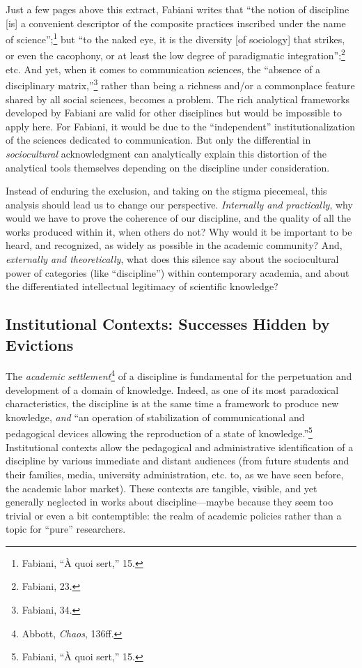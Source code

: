 \documentclass{tufte-handout}
\begin{document}
Just a few pages above this extract, Fabiani writes that ``the notion of
discipline {[}is{]} a convenient descriptor of the composite practices
inscribed under the name of science'';\footnote{Fabiani, ``À quoi
  sert,'' 15.} but ``to the naked eye, it is the diversity {[}of
sociology{]} that strikes, or even the cacophony, or at least the low
degree of paradigmatic integration'';\footnote{Fabiani, 23.} etc. And
yet, when it comes to communication sciences, the ``absence of a
disciplinary matrix,''\footnote{Fabiani, 34.} rather than being a
richness and/or a commonplace feature shared by all social sciences,
becomes a problem. The rich analytical frameworks developed by Fabiani
are valid for other disciplines but would be impossible to apply here.
For Fabiani, it would be due to the ``independent'' institutionalization
of the sciences dedicated to communication. But only the differential in
\emph{sociocultural} acknowledgment can analytically explain this
distortion of the analytical tools themselves depending on the
discipline under consideration.

Instead of enduring the exclusion, and taking on the stigma piecemeal,
this analysis should lead us to change our perspective. \emph{Internally
and practically}, why would we have to prove the coherence of our
discipline, and the quality of all the works produced within it, when
others do not? Why would it be important to be heard, and recognized, as
widely as possible in the academic community? And, \emph{externally and
theoretically}, what does this silence say about the sociocultural power
of categories (like ``discipline'') within contemporary academia, and
about the differentiated intellectual legitimacy of scientific
knowledge?

\hypertarget{institutional-contexts-successes-hidden-by-evictions}{%
\subsection{Institutional Contexts: Successes
Hidden by
Evictions}\label{institutional-contexts-successes-hidden-by-evictions}}

The \emph{academic} \emph{settlement}\footnote{Abbott, \emph{Chaos},
  136ff.} of a discipline is fundamental for the perpetuation and
development of a domain of knowledge. Indeed, as one of its most
paradoxical characteristics, the discipline is at the same time a
framework to produce new knowledge, \emph{and} ``an operation of
stabilization of communicational and pedagogical devices allowing the
reproduction of a state of knowledge.''\footnote{Fabiani, ``À quoi
  sert,'' 15.} Institutional contexts allow the pedagogical and
administrative identification of a discipline by various immediate and
distant audiences (from future students and their families, media,
university administration, etc. to, as we have seen before, the academic
labor market). These contexts are tangible, visible, and yet generally
neglected in works about discipline---maybe because they seem too
trivial or even a bit contemptible: the realm of academic policies
rather than a topic for ``pure'' researchers.
\end{document}
